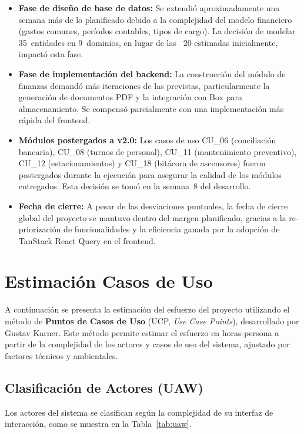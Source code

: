 \begin{itemize}
    \item \textbf{Fase de diseño de base de datos:} Se extendió aproximadamente una semana más de lo planificado debido a la complejidad del modelo financiero (gastos comunes, períodos contables, tipos de cargo). La decisión de modelar 35~entidades en 9~dominios, en lugar de las ~20 estimadas inicialmente, impactó esta fase.

    \item \textbf{Fase de implementación del backend:} La construcción del módulo de finanzas demandó más iteraciones de las previstas, particularmente la generación de documentos PDF y la integración con Box para almacenamiento. Se compensó parcialmente con una implementación más rápida del frontend.

    \item \textbf{Módulos postergados a v2.0:} Los casos de uso CU\_06 (conciliación bancaria), CU\_08 (turnos de personal), CU\_11 (mantenimiento preventivo), CU\_12 (estacionamientos) y CU\_18 (bitácora de ascensores) fueron postergados durante la ejecución para asegurar la calidad de los módulos entregados. Esta decisión se tomó en la semana~8 del desarrollo.

    \item \textbf{Fecha de cierre:} A pesar de las desviaciones puntuales, la fecha de cierre global del proyecto se mantuvo dentro del margen planificado, gracias a la re-priorización de funcionalidades y la eficiencia ganada por la adopción de TanStack React Query en el frontend.
\end{itemize}

\section{Estimación Casos de Uso}

A continuación se presenta la estimación del esfuerzo del proyecto utilizando el método de \textbf{Puntos de Casos de Uso} (UCP, \textit{Use Case Points}), desarrollado por Gustav Karner. Este método permite estimar el esfuerzo en horas-persona a partir de la complejidad de los actores y casos de uso del sistema, ajustado por factores técnicos y ambientales.

\subsection{Clasificación de Actores (UAW)}

Los actores del sistema se clasifican según la complejidad de su interfaz de interacción, como se muestra en la Tabla~\ref{tab:uaw}.

